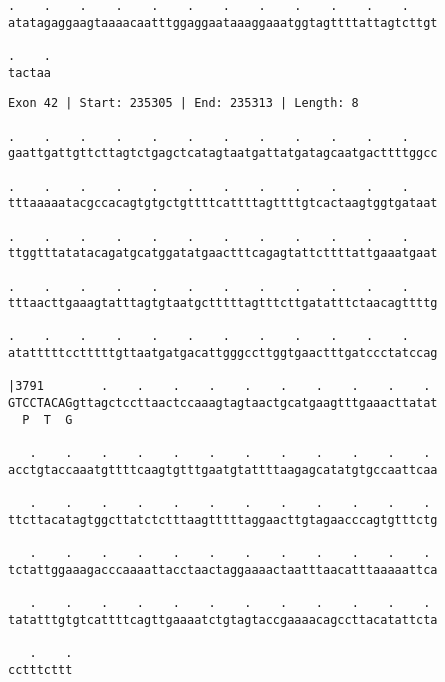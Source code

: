 \documentclass{article}
\begin{document}
\newpage
\begin{Verbatim}[fontfamily=courier]
.    .    .    .    .    .    .    .    .    .    .    .    
atatagaggaagtaaaacaatttggaggaataaaggaaatggtagttttattagtcttgt

.    .
tactaa
\end{Verbatim}
\newpage
\begin{Verbatim}[fontfamily=courier]
Exon 42 | Start: 235305 | End: 235313 | Length: 8

.    .    .    .    .    .    .    .    .    .    .    .    
gaattgattgttcttagtctgagctcatagtaatgattatgatagcaatgacttttggcc

.    .    .    .    .    .    .    .    .    .    .    .    
tttaaaaatacgccacagtgtgctgttttcattttagttttgtcactaagtggtgataat

.    .    .    .    .    .    .    .    .    .    .    .    
ttggtttatatacagatgcatggatatgaactttcagagtattcttttattgaaatgaat

.    .    .    .    .    .    .    .    .    .    .    .    
tttaacttgaaagtatttagtgtaatgctttttagtttcttgatatttctaacagttttg

.    .    .    .    .    .    .    .    .    .    .    .    
atatttttcctttttgttaatgatgacattgggccttggtgaactttgatccctatccag

|3791        .    .    .    .    .    .    .    .    .    . 
GTCCTACAGgttagctccttaactccaaagtagtaactgcatgaagtttgaaacttatat
  P  T  G                                                   

   .    .    .    .    .    .    .    .    .    .    .    . 
acctgtaccaaatgttttcaagtgtttgaatgtattttaagagcatatgtgccaattcaa

   .    .    .    .    .    .    .    .    .    .    .    . 
ttcttacatagtggcttatctctttaagtttttaggaacttgtagaacccagtgtttctg

   .    .    .    .    .    .    .    .    .    .    .    . 
tctattggaaagacccaaaattacctaactaggaaaactaatttaacatttaaaaattca

   .    .    .    .    .    .    .    .    .    .    .    . 
tatatttgtgtcattttcagttgaaaatctgtagtaccgaaaacagccttacatattcta

   .    .
cctttcttt
\end{Verbatim}
\newpage
\end{document}

